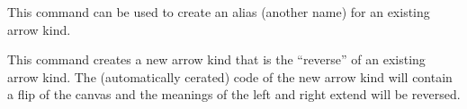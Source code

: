 \begin{command}{\pgfarrowsdeclarealias{}}
  This command can be used to create an alias (another name) for an
  existing arrow kind.

\begin{codeexample}[]
%
\end{codeexample}
\end{command}


\begin{command}{\pgfarrowsdeclarereversed{}}
  This command creates a new arrow kind that is the ``reverse'' of an
  existing arrow kind. The (automatically cerated) code of the new
  arrow kind will contain a flip of the canvas and the meanings of the
  left and right extend will be reversed. 

\begin{codeexample}[]
%
\end{codeexample}
\end{command}



